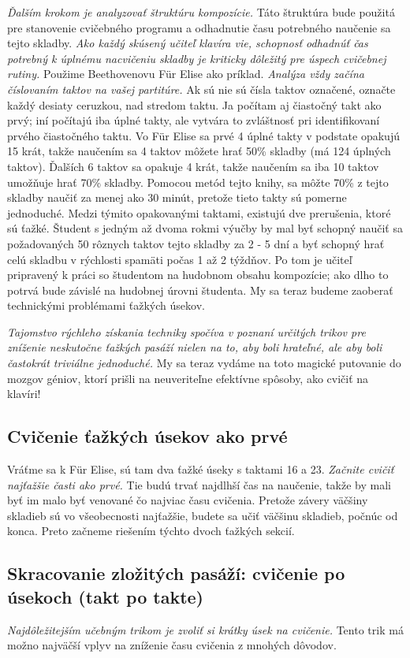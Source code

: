 \emph{Ďalším krokom je analyzovať štruktúru kompozície.} Táto štruktúra bude použitá pre stanovenie cvičebného programu a odhadnutie času potrebného naučenie sa tejto skladby. \emph{Ako každý skúsený učiteľ klavíra vie, schopnosť odhadnúť čas potrebný k úplnému nacvičeniu skladby je kriticky dôležitý pre úspech cvičebnej rutiny.} Použime Beethovenovu Für Elise ako príklad. \emph{Analýza vždy začína číslovaním taktov na vašej partitúre.} Ak sú nie sú čísla taktov označené, označte každý desiaty ceruzkou, nad stredom taktu. Ja počítam aj čiastočný takt ako prvý; iní počítajú iba úplné takty, ale vytvára to zvláštnosť pri identifikovaní prvého čiastočného taktu. Vo Für Elise sa prvé 4 úplné takty v podstate opakujú 15 krát, takže naučením sa 4 taktov môžete hrať 50\% skladby (má 124 úplných taktov). Ďalších 6 taktov sa opakuje 4 krát, takže naučením sa iba 10 taktov umožňuje hrať 70\% skladby. Pomocou metód tejto knihy, sa môžte 70\% z tejto skladby naučiť za menej ako 30 minút, pretože tieto takty sú pomerne jednoduché. Medzi týmito opakovanými taktami, existujú dve prerušenia, ktoré sú ťažké. Študent s jedným až dvoma rokmi výučby by mal byť schopný naučiť sa požadovaných 50 rôznych taktov tejto skladby za 2 - 5 dní a byť schopný hrať celú skladbu v rýchlosti spamäti počas 1 až 2 týždňov. Po tom je učiteľ pripravený k práci so študentom na hudobnom obsahu kompozície; ako dlho to potrvá bude závislé na hudobnej úrovni študenta. My sa teraz budeme zaoberať technickými problémami ťažkých úsekov.

\emph{Tajomstvo rýchleho získania techniky spočíva v poznaní určitých trikov pre zníženie neskutočne ťažkých pasáží nielen na to, aby boli hrateľné, ale aby boli častokrát triviálne jednoduché.} My sa teraz vydáme na toto magické putovanie do mozgov géniov, ktorí prišli na neuveriteľne efektívne spôsoby, ako cvičiť na klavíri!

\subsection{Cvičenie ťažkých úsekov ako prvé}
Vráťme sa k Für Elise, sú tam dva ťažké úseky s taktami 16 a 23. \emph{Začnite cvičiť najťažšie časti ako prvé.} Tie budú trvať najdlhší čas na naučenie, takže by mali byť im malo byť venované čo najviac času cvičenia. Pretože závery väčšiny skladieb sú vo všeobecnosti najťažšie, budete sa učiť väčšinu skladieb, počnúc od konca. Preto začneme riešením týchto dvoch ťažkých sekcií.

\subsection{Skracovanie zložitých pasáží: cvičenie po úsekoch (takt po takte)}
\emph{Najdôležitejším učebným trikom je zvoliť si krátky úsek na cvičenie.} Tento trik má možno najväčší vplyv na zníženie času cvičenia z mnohých dôvodov.

